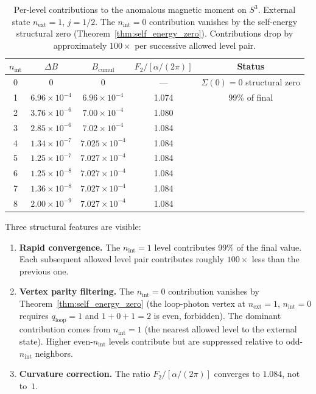 \documentclass[11pt]{article}
\begin{document}
\begin{table}[h]
\centering
\caption{Per-level contributions to the anomalous magnetic moment on
$S^3$.  External state $n_{\mathrm{ext}} = 1$, $j = 1/2$.
The $n_{\mathrm{int}} = 0$ contribution vanishes by the self-energy
structural zero (Theorem~\ref{thm:self_energy_zero}).
Contributions drop by approximately $100\times$ per successive allowed
level pair.}
\label{tab:g_minus_2}
\begin{tabular}{@{}ccccc@{}}
\toprule
$n_{\mathrm{int}}$ & $\Delta B$ & $B_{\mathrm{cumul}}$
  & $F_2 / [\alpha/(2\pi)]$ & Status \\
\midrule
0 & $0$     & $0$           & ---     & $\Sigma(0)=0$ structural zero \\
1 & $6.96 \times 10^{-4}$  & $6.96 \times 10^{-4}$  & 1.074  & 99\% of final \\
2 & $3.76 \times 10^{-6}$  & $7.00 \times 10^{-4}$  & 1.080  & \\
3 & $2.85 \times 10^{-6}$  & $7.02 \times 10^{-4}$  & 1.084  & \\
4 & $1.34 \times 10^{-7}$  & $7.025 \times 10^{-4}$ & 1.084  & \\
5 & $1.25 \times 10^{-7}$  & $7.027 \times 10^{-4}$ & 1.084  & \\
6 & $1.25 \times 10^{-8}$  & $7.027 \times 10^{-4}$ & 1.084  & \\
7 & $1.36 \times 10^{-8}$  & $7.027 \times 10^{-4}$ & 1.084  & \\
8 & $2.00 \times 10^{-9}$  & $7.027 \times 10^{-4}$ & 1.084  & \\
\bottomrule
\end{tabular}
\end{table}

Three structural features are visible:
\begin{enumerate}
\item \textbf{Rapid convergence.}  The $n_{\mathrm{int}} = 1$ level
      contributes 99\% of the final value.  Each subsequent allowed level
      pair contributes roughly $100\times$ less than the previous one.
\item \textbf{Vertex parity filtering.}
      The $n_{\mathrm{int}} = 0$ contribution vanishes by
      Theorem~\ref{thm:self_energy_zero} (the loop-photon vertex at
      $n_{\mathrm{ext}} = 1$, $n_{\mathrm{int}} = 0$ requires
      $q_{\mathrm{loop}} = 1$ and $1 + 0 + 1 = 2$ is even, forbidden).
      The dominant contribution comes from $n_{\mathrm{int}} = 1$
      (the nearest allowed level to the external state).
      Higher even-$n_{\mathrm{int}}$ levels contribute but are
      suppressed relative to odd-$n_{\mathrm{int}}$ neighbors.
\item \textbf{Curvature correction.}  The ratio
      $F_2 / [\alpha/(2\pi)]$ converges to $1.084$, not to~$1$.
\end{enumerate}
\end{document}
